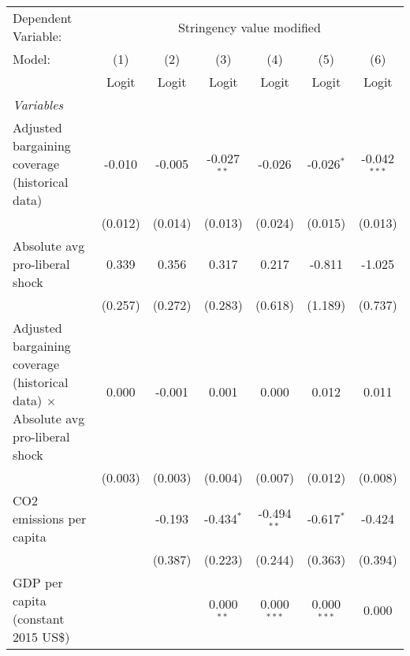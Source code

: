 
\begingroup
\centering
\begin{tabular}{lcccccc}
   \toprule
   Dependent Variable: & \multicolumn{6}{c}{Stringency value modified}\\
   Model:                                                                                  & (1)     & (2)     & (3)           & (4)           & (5)           & (6)\\  
                                                                                           &  Logit  & Logit   & Logit         & Logit         & Logit         & Logit\\  
   \midrule
   \emph{Variables}\\
   Adjusted bargaining coverage (historical data)                                          & -0.010  & -0.005  & -0.027$^{**}$ & -0.026        & -0.026$^{*}$  & -0.042$^{***}$\\   
                                                                                           & (0.012) & (0.014) & (0.013)       & (0.024)       & (0.015)       & (0.013)\\   
   Absolute avg pro-liberal shock                                                          & 0.339   & 0.356   & 0.317         & 0.217         & -0.811        & -1.025\\   
                                                                                           & (0.257) & (0.272) & (0.283)       & (0.618)       & (1.189)       & (0.737)\\   
   Adjusted bargaining coverage (historical data) $\times$ Absolute avg pro-liberal shock  & 0.000   & -0.001  & 0.001         & 0.000         & 0.012         & 0.011\\   
                                                                                           & (0.003) & (0.003) & (0.004)       & (0.007)       & (0.012)       & (0.008)\\   
   CO2 emissions per capita                                                                &         & -0.193  & -0.434$^{*}$  & -0.494$^{**}$ & -0.617$^{*}$  & -0.424\\   
                                                                                           &         & (0.387) & (0.223)       & (0.244)       & (0.363)       & (0.394)\\   
   GDP per capita (constant 2015 US\$)                                                     &         &         & 0.000$^{**}$  & 0.000$^{***}$ & 0.000$^{***}$ & 0.000\\   

\end{tabular}
